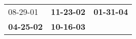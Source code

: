 \begin{supertabular}{p{0.33\columnwidth}p{0.33\columnwidth}p{0.33\columnwidth}}
          08-29-01\textsuperscript{} &  \textbf{11-23-02\textsuperscript{}} &  \textbf{01-31-04\textsuperscript{}} \\
 \textbf{04-25-02\textsuperscript{}} &  \textbf{10-16-03\textsuperscript{}} &                                      \\
\end{supertabular}
